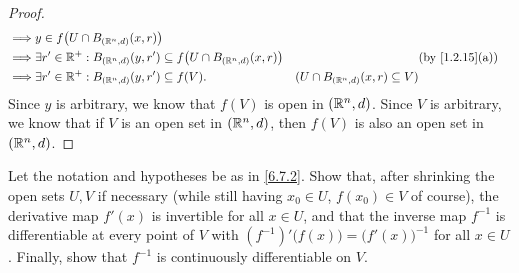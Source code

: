 \begin{proof}
\begin{align*}
    \implies & y \in f\big(U \cap B_{(\R^n, d)}(x, r)\big)                                                                                                                          \\
    \implies & \exists r' \in \R^+ : B_{(\R^n, d)}(y, r') \subseteq f\big(U \cap B_{(\R^n, d)}(x, r)\big) &                                          & \text{(by \cref{1.2.15}(a))} \\
    \implies & \exists r' \in \R^+ : B_{(\R^n, d)}(y, r') \subseteq f(V).                                 & (U \cap B_{(\R^n, d)}(x, r) \subseteq V)
  \end{align*}
  Since \(y\) is arbitrary, we know that \(f(V)\) is open in \((\mathbb{R}^n, d)\).
  Since \(V\) is arbitrary, we know that if \(V\) is an open set in \((\mathbb{R}^n, d)\), then \(f(V)\) is also an open set in \((\mathbb{R}^n, d)\).
\end{proof}

\begin{ex}\label{ex:6.7.4}
  Let the notation and hypotheses be as in \cref{6.7.2}.
  Show that, after shrinking the open sets \(U, V\) if necessary (while still having \(x_0 \in U\), \(f(x_0) \in V\) of course), the derivative map \(f'(x)\) is invertible for all \(x \in U\), and that the inverse map \(f^{-1}\) is differentiable at every point of \(V\) with \((f^{-1})' \big(f(x)\big) = \big(f'(x)\big)^{-1}\) for all \(x \in U\).
  Finally, show that \(f^{-1}\) is continuously differentiable on \(V\).
\end{ex}
